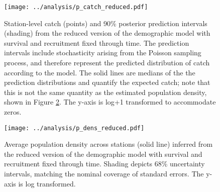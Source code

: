 \documentclass[11pt]{article}
\begin{document}
\begin{figure}
\centering
\texttt{[image: ../analysis/p\_catch\_reduced.pdf]}
\caption{\label{fig:p_catch_reduced}
Station-level catch (points) and 90\% posterior prediction intervals (shading) 
from the reduced version of the demographic model 
with survival and recruitment fixed through time.
The prediction intervals include stochasticity arising from the Poisson sampling process,
and therefore represent the predicted distribution of catch according to the model. 
The solid lines are medians of the the prediction distributions and quantify the expected
catch; note that this is not the same quantity as the estimated population density, 
shown in Figure \ref{fig:p_dens_reduced}.
The y-axis is log+1 transformed to accommodate zeros.
}
\end{figure}
\clearpage

\clearpage
\begin{figure}
\centering
\texttt{[image: ../analysis/p\_dens\_reduced.pdf]}
\caption{\label{fig:p_dens_reduced}
Average population density across stations (solid line)
inferred from the reduced version of the demographic model 
with survival and recruitment fixed through time.
Shading depicts 68\% uncertainty intervals, 
matching the nominal coverage of standard errors.
The y-axis is log transformed.
}
\end{figure}
\clearpage
\end{document}
